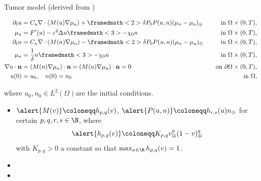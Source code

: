 \begin{frame}{Tumor model {\footnotesize (derived from \cite{van_der_zee_model})}}
	\footnotesize
	\vspace*{-0.2cm}
	\begin{block}{}
		\vspace*{-0.4cm}
		\begin{subequations}
			\begin{align*}
				\partial_t u&=C_u\nabla\cdot\left(M(u)\nabla\mu_u\right)+\framedmath<2>{\delta P_0P(u,n)(\mu_n-\mu_u)_\oplus} \quad&\text{in }\Omega\times (0,T),\\
				\mu_u&=F'(u)-\varepsilon^2\Delta u\framedmath<3>{-\chi_0 n}\quad&\text{in }\Omega\times (0,T),\\
				\partial_t n&=C_n\nabla\cdot\left(M(n)\nabla\mu_n\right)-\framedmath<2>{\delta P_0P(u,n)(\mu_n-\mu_u)_\oplus} \quad&\text{in }\Omega\times (0,T),\\
				\mu_n&=\frac{1}{\delta} n \framedmath<3>{-\chi_0 u} \quad&\text{in }\Omega\times (0,T),\\
				\nabla u\cdot \mathbf{n}&=\left( M(n)\nabla \mu_n\right)\cdot \mathbf{n}=\left( M(u)\nabla \mu_u\right)\cdot \mathbf{n}=0 \quad &\text{on }\partial\Omega\times (0,T),\\
				u(0)&=u_0,\quad n(0)=n_0\quad&\text{in }\Omega,%
			\end{align*}
		\end{subequations}
	\end{block}
	where $u_0,n_0\in L^2(\Omega)$are the initial conditions.
	
	\vspace*{0.2cm}
	\begin{itemize}
		\item $\alert{M(v)}\coloneqq h_{p,q}(v)$, $\alert{P(u,n)}\coloneqq h_{r,s}(u)n_\oplus$ for certain $p,q,r,s\in\N$, where 
		$$
		\alert{h_{p,q}(v)}\coloneqq K_{p,q}v_\oplus^p(1-v)_\oplus^q
		$$
		with $K_{p,q}>0$ a constant so that $\max_{x\in\R}h_{p,q}(v)=1$.
		\item<2> 
		\item<3> 
	\end{itemize}	
\end{frame}


